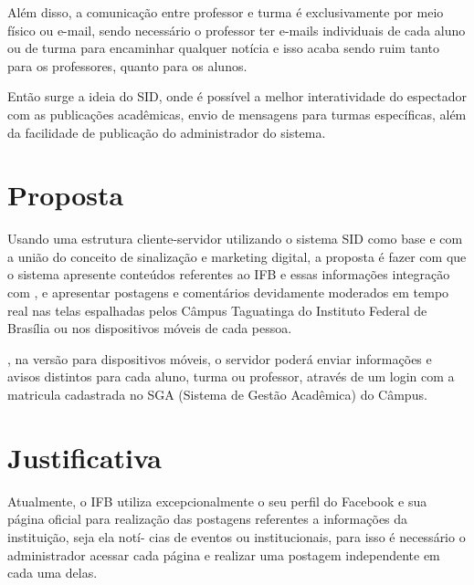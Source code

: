 Além disso, a comunicação entre professor e turma é exclusivamente por meio físico ou e-mail, sendo necessário o professor ter e-mails individuais de cada aluno ou de turma para encaminhar qualquer notícia e isso acaba sendo ruim tanto para os professores, quanto para os alunos. 


Então surge a ideia do SID, onde é possível a melhor interatividade do espectador com as publicações acadêmicas, envio de mensagens para turmas específicas, além da facilidade de publicação do administrador do sistema.


\section{Proposta}
Usando uma estrutura cliente-servidor  utilizando o sistema SID como base e com a união do conceito de sinalização e marketing digital, a proposta é fazer com que o sistema apresente conteúdos referentes ao IFB e essas informações  integração com , e apresentar postagens e comentários devidamente moderados em tempo real nas  telas espalhadas pelos Câmpus Taguatinga do Instituto Federal de Brasília ou nos dispositivos móveis de cada pessoa. 

, na versão para dispositivos móveis, o servidor poderá enviar informações e avisos distintos para cada aluno, turma ou professor, através de um login com a matricula cadastrada no SGA (Sistema de Gestão Acadêmica) do Câmpus.


\section{Justificativa}
Atualmente, o IFB utiliza excepcionalmente o seu perfil do Facebook e sua página
oficial para realização das postagens referentes a informações da instituição, seja ela notí-
cias de eventos ou institucionais, para isso é necessário o administrador acessar cada página
e realizar uma postagem independente em cada uma delas. 


